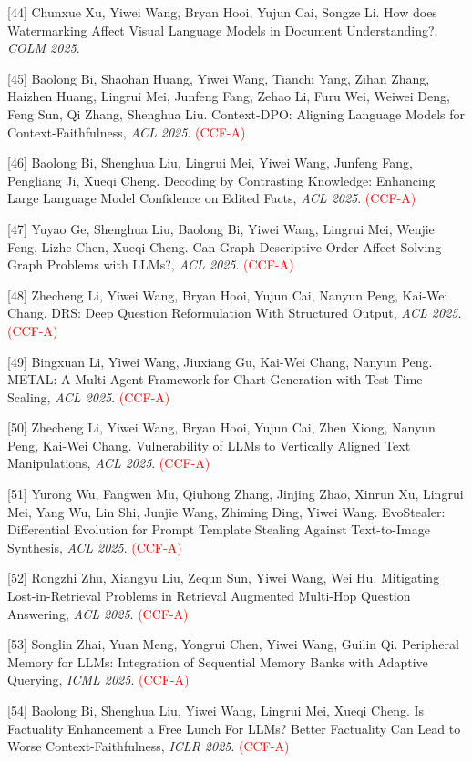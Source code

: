[44] Chunxue Xu, Yiwei Wang, Bryan Hooi, Yujun Cai, Songze Li. How does Watermarking Affect Visual Language Models in Document Understanding?, \textit{COLM 2025}.

[45] Baolong Bi, Shaohan Huang, Yiwei Wang, Tianchi Yang, Zihan Zhang, Haizhen Huang, Lingrui Mei, Junfeng Fang, Zehao Li, Furu Wei, Weiwei Deng, Feng Sun, Qi Zhang, Shenghua Liu. Context-DPO: Aligning Language Models for Context-Faithfulness, \textit{ACL 2025}. \textcolor{red}{(CCF-A)}

[46] Baolong Bi, Shenghua Liu, Lingrui Mei, Yiwei Wang, Junfeng Fang, Pengliang Ji, Xueqi Cheng. Decoding by Contrasting Knowledge: Enhancing Large Language Model Confidence on Edited Facts, \textit{ACL 2025}. \textcolor{red}{(CCF-A)}

[47] Yuyao Ge, Shenghua Liu, Baolong Bi, Yiwei Wang, Lingrui Mei, Wenjie Feng, Lizhe Chen, Xueqi Cheng. Can Graph Descriptive Order Affect Solving Graph Problems with LLMs?, \textit{ACL 2025}. \textcolor{red}{(CCF-A)}

[48] Zhecheng Li, Yiwei Wang, Bryan Hooi, Yujun Cai, Nanyun Peng, Kai-Wei Chang. DRS: Deep Question Reformulation With Structured Output, \textit{ACL 2025}. \textcolor{red}{(CCF-A)}

[49] Bingxuan Li, Yiwei Wang, Jiuxiang Gu, Kai-Wei Chang, Nanyun Peng. METAL: A Multi-Agent Framework for Chart Generation with Test-Time Scaling, \textit{ACL 2025}. \textcolor{red}{(CCF-A)}

[50] Zhecheng Li, Yiwei Wang, Bryan Hooi, Yujun Cai, Zhen Xiong, Nanyun Peng, Kai-Wei Chang. Vulnerability of LLMs to Vertically Aligned Text Manipulations, \textit{ACL 2025}. \textcolor{red}{(CCF-A)}

[51] Yurong Wu, Fangwen Mu, Qiuhong Zhang, Jinjing Zhao, Xinrun Xu, Lingrui Mei, Yang Wu, Lin Shi, Junjie Wang, Zhiming Ding, Yiwei Wang. EvoStealer: Differential Evolution for Prompt Template Stealing Against Text-to-Image Synthesis, \textit{ACL 2025}. \textcolor{red}{(CCF-A)}

[52] Rongzhi Zhu, Xiangyu Liu, Zequn Sun, Yiwei Wang, Wei Hu. Mitigating Lost-in-Retrieval Problems in Retrieval Augmented Multi-Hop Question Answering, \textit{ACL 2025}. \textcolor{red}{(CCF-A)}

[53] Songlin Zhai, Yuan Meng, Yongrui Chen, Yiwei Wang, Guilin Qi. Peripheral Memory for LLMs: Integration of Sequential Memory Banks with Adaptive Querying, \textit{ICML 2025}. \textcolor{red}{(CCF-A)}

[54] Baolong Bi, Shenghua Liu, Yiwei Wang, Lingrui Mei, Xueqi Cheng. Is Factuality Enhancement a Free Lunch For LLMs? Better Factuality Can Lead to Worse Context-Faithfulness, \textit{ICLR 2025}. \textcolor{red}{(CCF-A)}

